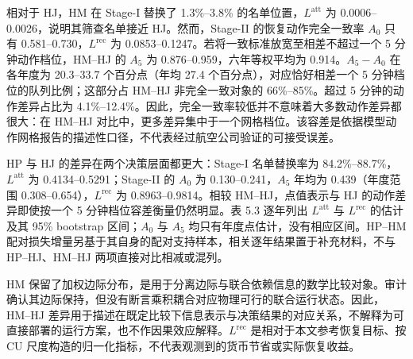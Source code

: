 \documentclass[UTF8,a4paper,11pt]{ctexart}
\numberwithin{table}{section}
\numberwithin{figure}{section}
\begin{document}
相对于 HJ，HM 在 Stage-I 替换了 1.3\%–3.8\% 的名单位置，$L^{\mathrm{att}}$ 为 0.0006–0.0026，说明其筛查名单接近 HJ。然而，Stage-II 的恢复动作完全一致率 $A_0$ 只有 0.581–0.730，$L^{\mathrm{rec}}$ 为 0.0853–0.1247。若将一致标准放宽至相差不超过一个 5 分钟动作档位，HM–HJ 的 $A_5$ 为 0.876–0.959，六年等权平均为 0.914。$A_5-A_0$ 在各年度为 20.3–33.7 个百分点（年均 27.4 个百分点），对应恰好相差一个 5 分钟档位的队列比例；这部分占 HM–HJ 非完全一致对象的 66\%–85\%。超过 5 分钟的动作差异占比为 4.1\%–12.4\%。因此，完全一致率较低并不意味着大多数动作差异都很大：在 HM–HJ 对比中，更多差异集中于一个网格档位。该容差是依据模型动作网格报告的描述性口径，不代表经过航空公司验证的可接受误差。

HP 与 HJ 的差异在两个决策层面都更大：Stage-I 名单替换率为 84.2\%–88.7\%，$L^{\mathrm{att}}$ 为 0.4134–0.5291；Stage-II 的 $A_0$ 为 0.130–0.241，$A_5$ 年均为 0.439（年度范围 0.308–0.654），$L^{\mathrm{rec}}$ 为 0.8963–0.9814。相较 HM–HJ，点值表示与 HJ 的动作差异即使按一个 5 分钟档位容差衡量仍然明显。表 5.3 逐年列出 $L^{\mathrm{att}}$ 与 $L^{\mathrm{rec}}$ 的估计及其 95\% bootstrap 区间；$A_0$ 与 $A_5$ 均只有年度点估计，没有相应区间。HP–HM 配对损失增量另基于其自身的配对支持样本，相关逐年结果置于补充材料，不与 HP–HJ、HM–HJ 两项直接对比相减或混列。

HM 保留了加权边际分布，是用于分离边际与联合依赖信息的数学比较对象。审计确认其边际保持，但没有断言乘积耦合对应物理可行的联合运行状态。因此，HM–HJ 差异用于描述在既定比较下信息表示与决策结果的对应关系，不解释为可直接部署的运行方案，也不作因果效应解释。$L^{\mathrm{rec}}$ 是相对于本文参考恢复目标、按 CU 尺度构造的归一化指标，不代表观测到的货币节省或实际恢复收益。
\end{document}
